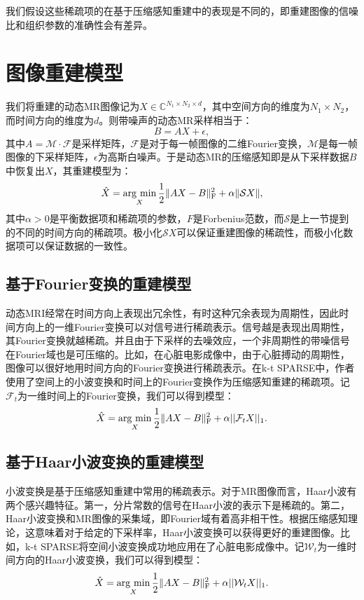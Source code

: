 我们假设这些稀疏项的在基于压缩感知重建中的表现是不同的，即重建图像的信噪比和组织参数的准确性会有差异。

\section{图像重建模型}
我们将重建的动态MR图像记为$X\in \mathbb{C}^{N_1\times N_2\times d}$，其中空间方向的维度为$N_1\times N_2$，而时间方向的维度为$d$。则带噪声的动态MR采样相当于：
$$B=AX+\epsilon,$$
其中$A=\mathcal{M}\cdot \mathcal{F}$是采样矩阵，$\mathcal{F}$是对于每一帧图像的二维Fourier变换，$\mathcal{M}$是每一帧图像的下采样矩阵，$\epsilon$为高斯白噪声。于是动态MR的压缩感知即是从下采样数据$B$中恢复出$X$，其重建模型为：
\begin{equation}
\hat{X} = \argmin_X \frac{1}{2}\|AX-B\|_\mathrm{F}^2 + \alpha\|\mathcal{S}X\|,
\end{equation}
其中$\alpha>0$是平衡数据项和稀疏项的参数，$F$是Forbenius范数，而$\mathcal{S}$是上一节提到的不同的时间方向的稀疏项。极小化$\mathcal{S}X$可以保证重建图像的稀疏性，而极小化数据项可以保证数据的一致性。

\subsection{基于Fourier变换的重建模型}
动态MRI经常在时间方向上表现出冗余性，有时这种冗余表现为周期性，因此时间方向上的一维Fourier变换可以对信号进行稀疏表示。信号越是表现出周期性，其Fourier变换就越稀疏。并且由于下采样的去噪效应，一个非周期性的带噪信号在Fourier域也是可压缩的。比如，在心脏电影成像中，由于心脏搏动的周期性，图像可以很好地用时间方向的Fourier变换进行稀疏表示。在k-t SPARSE\cite{Lustig2010Sparse}中，作者使用了空间上的小波变换和时间上的Fourier变换作为压缩感知重建的稀疏项。记$\mathcal{F}_t$为一维时间上的Fourier变换，我们可以得到模型：
\begin{equation}
\hat{X} = \argmin_X \frac{1}{2}\|AX-B\|_\mathrm{F}^2 + \alpha ||\mathcal{F}_t X||_1.
\end{equation}

\subsection{基于Haar小波变换的重建模型}
小波变换是基于压缩感知重建中常用的稀疏表示。对于MR图像而言，Haar小波有两个感兴趣特征。第一，分片常数的信号在Haar小波的表示下是稀疏的。第二，Haar小波变换和MR图像的采集域，即Fourier域有着高非相干性。根据压缩感知理论，这意味着对于给定的下采样率，Haar小波变换可以获得更好的重建图像。比如，k-t SPARSE\cite{Lustig2010Sparse}将空间小波变换成功地应用在了心脏电影成像中。记$\mathcal{W}_t$为一维时间方向的Haar小波变换，我们可以得到模型：
\begin{equation}
\hat{X} = \argmin_X \frac{1}{2}\|AX-B\|_\mathrm{F}^2 + \alpha ||\mathcal{W}_t X||_1.
\end{equation}

